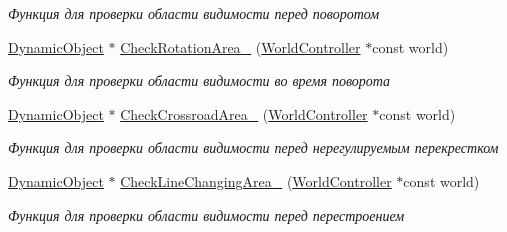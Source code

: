 \begin{Indent}
\begin{DoxyCompactItemize}
\begin{DoxyCompactList}\small\item\em Функция для проверки области видимости перед поворотом \end{DoxyCompactList}\item 
\hyperlink{classrtm_1_1_dynamic_object}{Dynamic\+Object} $\ast$ \hyperlink{classrtm_1_1_vehicle_object_a377af8433f7cd5cf99d8ab432dbc4e44}{Check\+Rotation\+Area\+\_\+} (\hyperlink{classrtm_1_1_world_controller}{World\+Controller} $\ast$const world)
\begin{DoxyCompactList}\small\item\em Функция для проверки области видимости во время поворота \end{DoxyCompactList}\item 
\hyperlink{classrtm_1_1_dynamic_object}{Dynamic\+Object} $\ast$ \hyperlink{classrtm_1_1_vehicle_object_a1e193bc81dc4b6c14d29c6be17db1071}{Check\+Crossroad\+Area\+\_\+} (\hyperlink{classrtm_1_1_world_controller}{World\+Controller} $\ast$const world)
\begin{DoxyCompactList}\small\item\em Функция для проверки области видимости перед нерегулируемым перекрестком \end{DoxyCompactList}\item 
\hyperlink{classrtm_1_1_dynamic_object}{Dynamic\+Object} $\ast$ \hyperlink{classrtm_1_1_vehicle_object_a397b0e3055f0dfe3f2b1b731cd5e2eb1}{Check\+Line\+Changing\+Area\+\_\+} (\hyperlink{classrtm_1_1_world_controller}{World\+Controller} $\ast$const world)
\begin{DoxyCompactList}\small\item\em Функция для проверки области видимости перед перестроением \end{DoxyCompactList}\end{DoxyCompactItemize}
\end{Indent}
